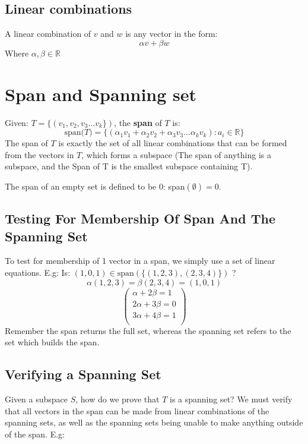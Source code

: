 \documentclass[11pt]{book}
\begin{document}
{\subsection{Linear combinations}
\par{A linear combination of $v$ and $w$ is any vector in the form: 
	\[
	\alpha v+\beta w
	\] 
Where $\alpha,\beta\in\mathbb{R}$}
\section{Span and Spanning set}
\par{Given: $T=\lbrace(v_{1},v_{2},v_{3}...v_{k}\rbrace)$, the \textbf{span} of $T$ is:
\[
	\text{span($T$)}=\lbrace\left(\alpha_{1}v_{1}+\alpha_{2}v_{2}+\alpha_{3}v_{3}...\alpha_{k}v_{k}\right): a_{i}\in\mathbb{R}\rbrace
\] 
The span of $T$ is exactly the set of all linear combinations that can be formed from the vectors in $T$, which forms a subspace (The span of anything is a subspace, and the Span of T is the smallest subspace containing T). 

The span of an empty set is defined to be 0: span$\left(\emptyset\right)=0$.
}
\subsection{Testing For Membership Of Span And The Spanning Set}
\par{To test for membership of 1 vector in a span, we simply use a set of linear equations. E.g:}
Is: $\left(1,0,1\right)\in\text{span}\left(\lbrace\left(1,2,3\right),\left(2,3,4\right)\rbrace\right)$ ?
$$\alpha\left(1,2,3\right)=\beta\left(2,3,4\right)=\left(1,0,1\right)$$
$$
\begin{pmatrix}
	\alpha +2\beta=1 \\
	2\alpha+3\beta=0 \\
	3\alpha+4\beta=1 \\
\end{pmatrix}
$$
Remember the span returns the full set, whereas the spanning set refers to the set which builds the span.
\subsection{Verifying a Spanning Set}
\par{Given a subspace $S$, how do we prove that $T$ is a spanning set? We must verify that all vectors in the span can be made from linear combinations of the spanning sets, as well as the spanning sets being unable to make anything outside of the span. E.g:

}}
\end{document}
